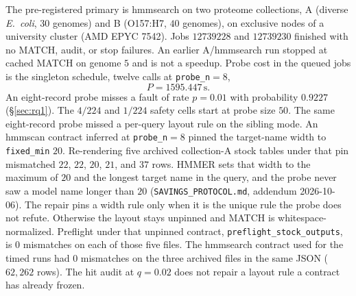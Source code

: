 \documentclass[letterpaper,twocolumn,10pt]{article}
\begin{document}
The pre-registered primary is hmmsearch on two proteome collections, A (diverse \textit{E.\ coli},
$30$
genomes) and B (O157:H7,
$40$
genomes), on exclusive nodes of a university cluster (AMD EPYC 7542).
Jobs
$12739228$
and
$12739230$
finished with no MATCH, audit, or stop failures.
An earlier A/hmmsearch run stopped at cached MATCH on genome
$5$
and is not a speedup.
Probe cost in the queued jobs is the singleton schedule, twelve calls at \texttt{probe\_n}${}=8$,
\[
P = 1595.447\,\mathrm{s}.
\]
An eight-record probe misses a fault of rate $p = 0.01$ with probability
$0.9227$
(\S\ref{sec:rq1}).
The
$4/224$
and
$1/224$
safety cells start at probe size $50$.
The same eight-record probe missed a per-query layout rule on the sibling mode.
An hmmscan contract inferred at \texttt{probe\_n}${}=8$ pinned the target-name width to \texttt{fixed\_min} $20$.
Re-rendering five archived collection-A stock tables under that pin mismatched
$22$, $22$, $20$, $21$, and $37$
rows.
HMMER sets that width to the maximum of $20$ and the longest target name in the query, and the probe never saw a model name longer than $20$ (\texttt{SAVINGS\_PROTOCOL.md}, addendum 2026-10-06).
The repair pins a width rule only when it is the unique rule the probe does not refute.
Otherwise the layout stays unpinned and MATCH is whitespace-normalized.
Preflight under that unpinned contract,
\texttt{preflight\_stock\_outputs},
is
$0$
mismatches on each of those five files.
The hmmsearch contract used for the timed runs had
$0$
mismatches on the three archived files in the same JSON
($62{,}262$ rows).
The hit audit at $q = 0.02$ does not repair a layout rule a contract has already frozen.
\end{document}
